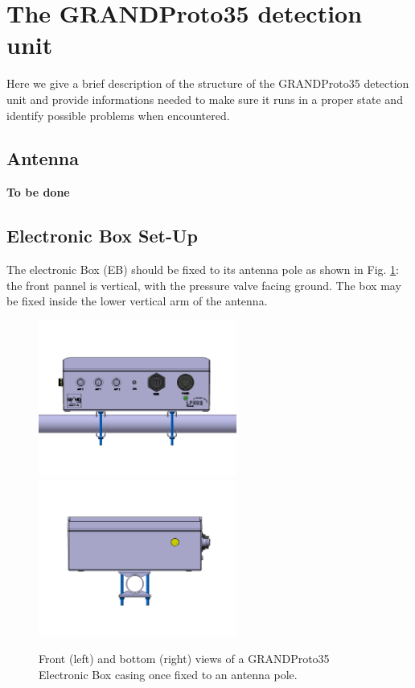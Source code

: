 \section{The GRANDProto35 detection unit} 
\label{feu}
Here we give a brief description of the structure of the GRANDProto35 detection unit and provide informations needed to make sure it runs in a proper state and identify possible problems when encountered. 

\subsection{Antenna}
{\bf To be done}

\subsection{Electronic Box Set-Up}
The electronic Box (EB) should be fixed to its antenna pole as shown in Fig. \ref{fig:casing}: the front pannel is vertical, with the pressure valve facing ground. The box may be fixed inside the lower vertical arm of the antenna. 

\begin{figure}[t!]
\begin{center}
{
\includegraphics[width=6.5cm,angle=90]{plots/casing.jpg}  
\includegraphics[width=6.5cm,angle=90]{plots/casing_bottom.jpg} 
}
\end{center}
\caption{Front (left) and bottom (right) views of a GRANDProto35 Electronic Box casing once fixed to an antenna pole. 
}
\label{fig:casing} 
\end{figure}


